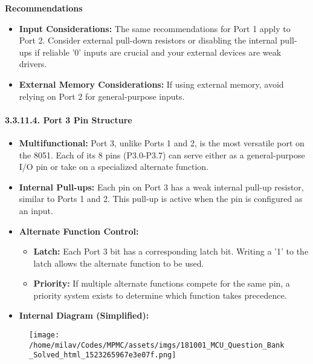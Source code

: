 \documentclass[
]{article}
\begin{document}
\textbf{Recommendations}

\begin{itemize}
\item
  \textbf{Input Considerations:} The same recommendations for Port 1
  apply to Port 2. Consider external pull-down resistors or disabling
  the internal pull-ups if reliable '0' inputs are crucial and your
  external devices are weak drivers.
\item
  \textbf{External Memory Considerations:} If using external memory,
  avoid relying on Port 2 for general-purpose inputs.
\end{itemize}

\hypertarget{33114-port-3-pin-structure}{%
\paragraph{3.3.11.4. Port 3 Pin
Structure}\label{33114-port-3-pin-structure}}

\begin{itemize}
\item
  \textbf{Multifunctional:} Port 3, unlike Ports 1 and 2, is the most
  versatile port on the 8051. Each of its 8 pins (P3.0-P3.7) can serve
  either as a general-purpose I/O pin or take on a specialized alternate
  function.
\item
  \textbf{Internal Pull-ups:} Each pin on Port 3 has a weak internal
  pull-up resistor, similar to Ports 1 and 2. This pull-up is active
  when the pin is configured as an input.
\item
  \textbf{Alternate Function Control:}

  \begin{itemize}
  \item
    \textbf{Latch:} Each Port 3 bit has a corresponding latch bit.
    Writing a '1' to the latch allows the alternate function to be used.
  \item
    \textbf{Priority:} If multiple alternate functions compete for the
    same pin, a priority system exists to determine which function takes
    precedence.
  \end{itemize}
\item
  \textbf{Internal Diagram (Simplified):}
\end{itemize}

\begin{figure}
\centering
\texttt{[image: /home/milav/Codes/MPMC/assets/imgs/181001\_MCU\_Question\_Bank\_Solved\_html\_1523265967e3e07f.png]}
\caption{}
\end{figure}
\end{document}
